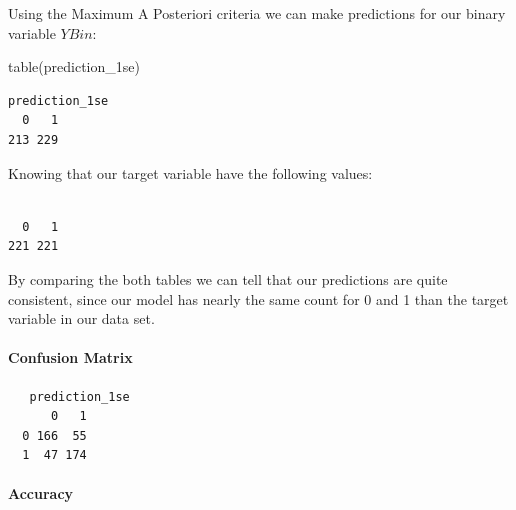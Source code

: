 \documentclass[
]{article}
\newenvironment{Shaded}{\begin{snugshade}}{\end{snugshade}}
\newcommand{\FunctionTok}[1]{\textcolor[rgb]{0.00,0.00,0.00}{#1}}
\newcommand{\NormalTok}[1]{#1}
\newcommand{\OtherTok}[1]{\textcolor[rgb]{0.56,0.35,0.01}{#1}}
\newcommand{\SpecialCharTok}[1]{\textcolor[rgb]{0.00,0.00,0.00}{#1}}
\begin{document}
Using the Maximum A Posteriori criteria we can make predictions for our
binary variable \(YBin\):

\begin{Shaded}
\begin{Highlighting}[]
\FunctionTok{table}\NormalTok{(prediction\_1se)}
\end{Highlighting}
\end{Shaded}

\begin{verbatim}
prediction_1se
  0   1 
213 229 
\end{verbatim}

Knowing that our target variable have the following values:

\begin{Shaded}
\end{Shaded}

\begin{verbatim}

  0   1 
221 221 
\end{verbatim}

By comparing the both tables we can tell that our predictions are quite
consistent, since our model has nearly the same count for 0 and 1 than
the target variable in our data set.

\hypertarget{confusion-matrix-2}{%
\paragraph{Confusion Matrix}\label{confusion-matrix-2}}

\begin{Shaded}
\end{Shaded}

\begin{verbatim}
   prediction_1se
      0   1
  0 166  55
  1  47 174
\end{verbatim}

\hypertarget{accuracy-2}{%
\paragraph{Accuracy}\label{accuracy-2}}
\end{document}
